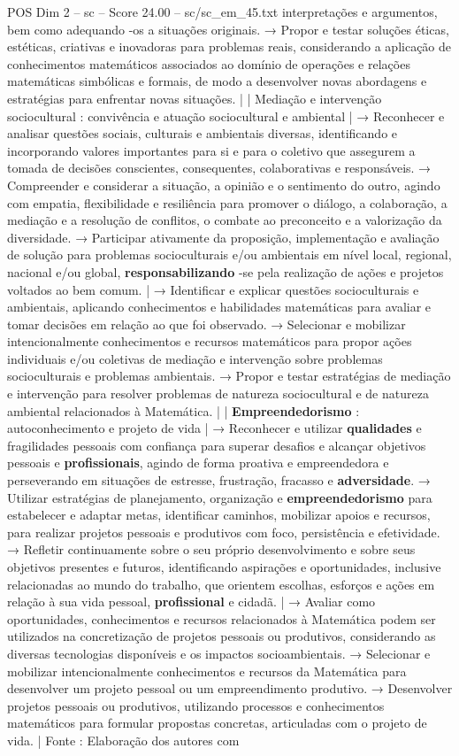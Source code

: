 \begin{textsample}{POS Dim 2 – sc – Score 24.00 – sc/sc\_em\_45.txt}
interpretações e argumentos, bem como adequando -os a situações originais. → Propor e testar soluções éticas, estéticas, criativas e inovadoras para problemas reais, considerando a aplicação de conhecimentos matemáticos associados ao domínio de operações e relações matemáticas simbólicas e formais, de modo a desenvolver novas abordagens e estratégias para enfrentar novas situações. | | Mediação e intervenção sociocultural : convivência e atuação sociocultural e ambiental | → Reconhecer e analisar questões sociais, culturais e ambientais diversas, identificando e incorporando valores importantes para si e para o coletivo que assegurem a tomada de decisões conscientes, consequentes, colaborativas e responsáveis. → Compreender e considerar a situação, a opinião e o sentimento do outro, agindo com empatia, flexibilidade e resiliência para promover o diálogo, a colaboração, a mediação e a resolução de conflitos, o combate ao preconceito e a valorização da diversidade. → Participar ativamente da proposição, implementação e avaliação de solução para problemas socioculturais e/ou ambientais em nível local, regional, nacional e/ou global, \textbf{responsabilizando} -se pela realização de ações e projetos voltados ao bem comum. | → Identificar e explicar questões socioculturais e ambientais, aplicando conhecimentos e habilidades matemáticas para avaliar e tomar decisões em relação ao que foi observado. → Selecionar e mobilizar intencionalmente conhecimentos e recursos matemáticos para propor ações individuais e/ou coletivas de mediação e intervenção sobre problemas socioculturais e problemas ambientais. → Propor e testar estratégias de mediação e intervenção para resolver problemas de natureza sociocultural e de natureza ambiental relacionados à Matemática. | | \textbf{Empreendedorismo} : autoconhecimento e projeto de vida | → Reconhecer e utilizar \textbf{qualidades} e fragilidades pessoais com confiança para superar desafios e alcançar objetivos pessoais e \textbf{profissionais}, agindo de forma proativa e empreendedora e perseverando em situações de estresse, frustração, fracasso e \textbf{adversidade}. → Utilizar estratégias de planejamento, organização e \textbf{empreendedorismo} para estabelecer e adaptar metas, identificar caminhos, mobilizar apoios e recursos, para realizar projetos pessoais e produtivos com foco, persistência e efetividade. → Refletir continuamente sobre o seu próprio desenvolvimento e sobre seus objetivos presentes e futuros, identificando aspirações e oportunidades, inclusive relacionadas ao mundo do trabalho, que orientem escolhas, esforços e ações em relação à sua vida pessoal, \textbf{profissional} e cidadã. | → Avaliar como oportunidades, conhecimentos e recursos relacionados à Matemática podem ser utilizados na concretização de projetos pessoais ou produtivos, considerando as diversas tecnologias disponíveis e os impactos socioambientais. → Selecionar e mobilizar intencionalmente conhecimentos e recursos da Matemática para desenvolver um projeto pessoal ou um empreendimento produtivo. → Desenvolver projetos pessoais ou produtivos, utilizando processos e conhecimentos matemáticos para formular propostas concretas, articuladas com o projeto de vida. | Fonte : Elaboração dos autores com 
\end{textsample}
